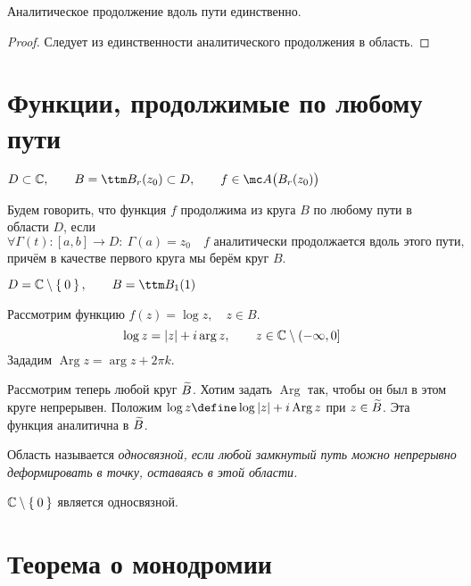 \begin{theorem}
	Аналитическое продолжение вдоль пути единственно.
\end{theorem}

\begin{proof}
	Следует из единственности аналитического продолжения в область.
\end{proof}

\section{Функции, продолжимые по любому пути}

\begin{definition}
	$ D \sub \Co, \qquad B = \ttm B_r(z_0) \sub D, \qquad f \in \mc A \big( B_r(z_0) \big) $

	Будем говорить, что функция $ f $ продолжима из круга $ B $ по любому пути в области $ D $, если
	$$ \forall \Gamma(t) : [a, b] \to D : ~ \Gamma(a) = z_0 \quad f \text{ аналитически продолжается вдоль этого пути}, $$
	причём в качестве первого круга мы берём круг $ B $.
\end{definition}

\begin{eg}
	$ D = \Co \setminus \set0, \qquad B = \ttm B_1(1) $

	Рассмотрим функцию $ f(z) = \log z, \quad z \in B $.
	$$ \log z = |z| + i \operatorname{arg} z, \qquad z \in \mathbb{C} \setminus (-\infty, 0] $$
	Зададим $ \operatorname{Arg} z = \operatorname{arg} z + 2\pi k $.

	Рассмотрим теперь любой круг $ \widetilde B $. Хотим задать $ \operatorname{Arg} $ так, чтобы он был в этом круге непрерывен. Положим $ \log z \define \log |z| + i \operatorname{Arg} z $ при $ z \in \widetilde B $. Эта функция аналитична в $ \widetilde B $.
\end{eg}

\begin{definition}
	Область называется \it{односвязной}, если любой замкнутый путь можно непрерывно деформировать в точку, оставаясь в этой области.
\end{definition}

\begin{eg}
	$ \mathbb{C} \setminus \Set 0 $  является односвязной.
\end{eg}

\section{Теорема о монодромии}

